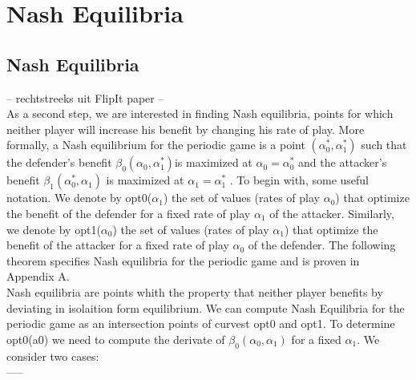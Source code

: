 \chapter{Nash Equilibria}
\label{chapter:Nash}
%


\section{Nash Equilibria}
-- rechtstreeks uit FlipIt paper --\\
As a second step, we are interested in finding Nash equilibria, points
for which neither player will increase his benefit by changing his rate of play. More
formally, a Nash equilibrium for the periodic game is a point $(\alpha_{0}^{*},\alpha_{1}^{*})$ such that
the defender's benefit $\beta_{0}(\alpha_{0},\alpha_{1}^{*}) $is maximized at $\alpha_{0}= \alpha_{0}^{*}$ and the attacker's benefit
$\beta_{1}(\alpha_{0}^{*},\alpha_{1}) $ is maximized at $\alpha_{1}= \alpha_{1}^{*}$ .
To begin with, some useful notation. We denote by opt0($\alpha_{1}$) the set of values (rates
of play $\alpha_{0}$) that optimize the benefit of the defender for a fixed rate of play $\alpha_{1}$ of the
attacker. Similarly, we denote by opt1($\alpha_{0}$) the set of values (rates of play $\alpha_{1}$) that optimize
the benefit of the attacker for a fixed rate of play $\alpha_{0}$ of the defender. The following
theorem specifies Nash equilibria for the periodic game and is proven in Appendix A. \\

Nash equilibria are points whith the property that neither player benefits by deviating in isolaition form equilibrium. We can compute Nash Equilibria for the periodic game as an intersection points of curvest opt0 and opt1. To determine opt0(a0) we need to compute the derivate of  $\beta_{0}(\alpha_{0},\alpha_{1}) $ for a fixed $\alpha_{1}$. We consider two cases:\\
-----

